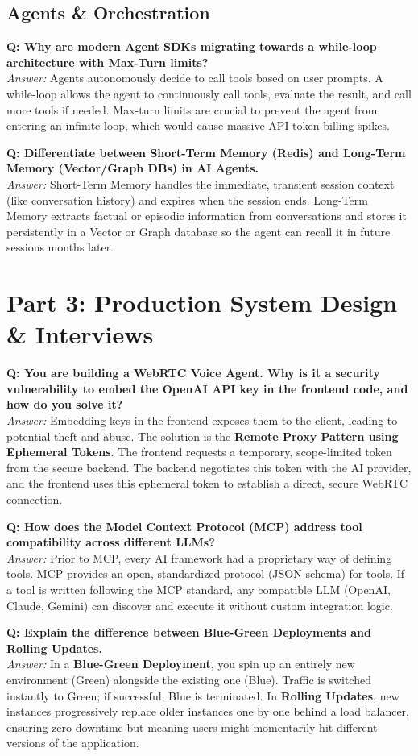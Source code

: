 \documentclass[12pt,a4paper]{article}
\begin{document}
\subsection{Agents \& Orchestration}
\textbf{Q: Why are modern Agent SDKs migrating towards a while-loop architecture with Max-Turn limits?} \\
\textit{Answer:} Agents autonomously decide to call tools based on user prompts. A while-loop allows the agent to continuously call tools, evaluate the result, and call more tools if needed. Max-turn limits are crucial to prevent the agent from entering an infinite loop, which would cause massive API token billing spikes.

\textbf{Q: Differentiate between Short-Term Memory (Redis) and Long-Term Memory (Vector/Graph DBs) in AI Agents.} \\
\textit{Answer:} Short-Term Memory handles the immediate, transient session context (like conversation history) and expires when the session ends. Long-Term Memory extracts factual or episodic information from conversations and stores it persistently in a Vector or Graph database so the agent can recall it in future sessions months later.

\section{Part 3: Production System Design \& Interviews}

\textbf{Q: You are building a WebRTC Voice Agent. Why is it a security vulnerability to embed the OpenAI API key in the frontend code, and how do you solve it?} \\
\textit{Answer:} Embedding keys in the frontend exposes them to the client, leading to potential theft and abuse. The solution is the \textbf{Remote Proxy Pattern using Ephemeral Tokens}. The frontend requests a temporary, scope-limited token from the secure backend. The backend negotiates this token with the AI provider, and the frontend uses this ephemeral token to establish a direct, secure WebRTC connection.

\textbf{Q: How does the Model Context Protocol (MCP) address tool compatibility across different LLMs?} \\
\textit{Answer:} Prior to MCP, every AI framework had a proprietary way of defining tools. MCP provides an open, standardized protocol (JSON schema) for tools. If a tool is written following the MCP standard, any compatible LLM (OpenAI, Claude, Gemini) can discover and execute it without custom integration logic.

\textbf{Q: Explain the difference between Blue-Green Deployments and Rolling Updates.} \\
\textit{Answer:} In a \textbf{Blue-Green Deployment}, you spin up an entirely new environment (Green) alongside the existing one (Blue). Traffic is switched instantly to Green; if successful, Blue is terminated. In \textbf{Rolling Updates}, new instances progressively replace older instances one by one behind a load balancer, ensuring zero downtime but meaning users might momentarily hit different versions of the application.
\end{document}
